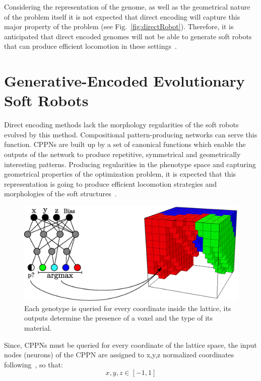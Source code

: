 Considering the representation of the genome, as well as the geometrical nature of the problem itself it is not expected that direct encoding will capture this major property of the problem (see Fig.~\ref{fig:directRobot}). Therefore, it is anticipated that direct encoded genomes will not be able to generate soft robots that can produce efficient locomotion in these settings~\citep{cheney2013unshackling}.





\section{Generative-Encoded Evolutionary Soft Robots}

Direct encoding methods lack the morphology regularities of the soft robots evolved by this method. Compositional pattern-producing networks can serve this function. CPPNs are built up by a set of canonical functions which enable the outputs of the network to produce repetitive, symmetrical and geometrically interesting patterns. Producing regularities in the phenotype space and capturing geometrical properties of the optimization problem, it is expected that this representation is going to produce efficient locomotion strategies and morphologies of the soft structures~\citep{cheney2013unshackling}.
\begin{figure}
\centering
\includegraphics[height=0.2\textheight]{../Figures/Misc/cppnSoftBot.eps}
\caption{Each genotype is queried for every coordinate inside the lattice, its outputs determine the presence of a voxel and the type of its material.}
\label{fig:cppnDiagram}
\end{figure}
Since, CPPNs must be queried for every coordinate of the lattice space, the input nodes (neurons) of the CPPN are assigned to x,y,z normalized coordinates following~\citep{cheney2013unshackling}, so that:
\[x,y,z \in [-1,1]\]
